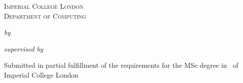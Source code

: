 \begin{titlepage}

\center

\textsc{\Large{Imperial College London}}\\[0.5cm] 
\textsc{\large{Department of Computing}}\\[0.5cm] 

\vspace{4cm}
\huge{\textbf{\reporttitle}}
\vspace{2cm}

\large{
  \emph{by} \\
  \vspace{0.1cm}
  \textbf{\name}
}

\vspace{1cm}

\large{
  \emph{supervised by} \\
  \vspace{0.1cm}
  \textbf{\supervisor}
}

\vfill %
\large{
Submitted in partial fulfillment of the requirements for the MSc degree in
\course~of Imperial College London\\[0.5cm]
}

\makeatletter
\@date 
\makeatother

\end{titlepage}
